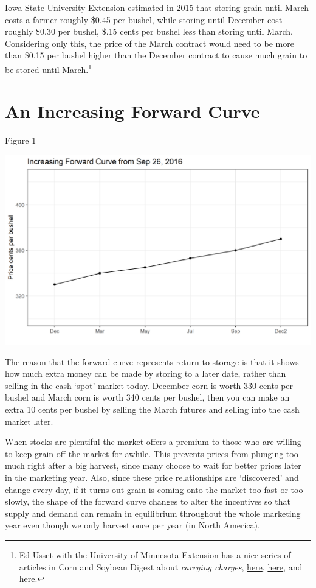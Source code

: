 \documentclass[
  letterpaper,
  DIV=11,
  numbers=noendperiod]{scrreprt}
\begin{document}
Iowa State University Extension estimated in 2015 that storing grain
until March costs a farmer roughly \$0.45 per bushel, while storing
until December cost roughly \$0.30 per bushel, \$.15 cents per bushel
less than storing until March. Considering only this, the price of the
March contract would need to be more than \$0.15 per bushel higher than
the December contract to cause much grain to be stored until
March.\footnote{Ed Usset with the University of Minnesota Extension has
  a nice series of articles in Corn and Soybean Digest about
  \emph{carrying charges},
  \href{http://www.cornandsoybeandigest.com/marketing/understand-carrying-charges}{here},
  \href{http://www.cornandsoybeandigest.com/carrying-charges-part-1}{here},
  and
  \href{http://www.cornandsoybeandigest.com/carrying-charges-part-2}{here}.}

\section{An Increasing Forward Curve}\label{an-increasing-forward-curve}

Figure 1

\includegraphics{assets/PricesSpaceTime-increasing-9-26-2016.png}

The reason that the forward curve represents return to storage is that
it shows how much extra money can be made by storing to a later date,
rather than selling in the cash `spot' market today. December corn is
worth 330 cents per bushel and March corn is worth 340 cents per bushel,
then you can make an extra 10 cents per bushel by selling the March
futures and selling into the cash market later.

When stocks are plentiful the market offers a premium to those who are
willing to keep grain off the market for awhile. This prevents prices
from plunging too much right after a big harvest, since many choose to
wait for better prices later in the marketing year. Also, since these
price relationships are `discovered' and change every day, if it turns
out grain is coming onto the market too fast or too slowly, the shape of
the forward curve changes to alter the incentives so that supply and
demand can remain in equilibrium throughout the whole marketing year
even though we only harvest once per year (in North America).
\end{document}
